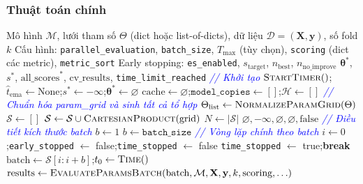 \documentclass[12pt,a4paper]{article}
\begin{document}
\subsubsection{Thuật toán chính}

\begin{algorithm}[H]
\caption{Grid Search với tối ưu hóa tài nguyên trong HAutoML}
\label{alg:grid_search}
\scriptsize
\begin{algorithmic}[1]
\Require Mô hình $\mathcal{M}$, lưới tham số $\Theta$ (dict hoặc list-of-dicts), dữ liệu $\mathcal{D} = (\mathbf{X}, \mathbf{y})$, số fold $k$
\Require Cấu hình: \texttt{parallel\_evaluation}, \texttt{batch\_size}, $T_{\max}$ (tùy chọn), \texttt{scoring} (dict các metric), \texttt{metric\_sort}
\Require Early stopping: \texttt{es\_enabled}, $s_{\text{target}}$, $n_{\text{best}}$, $n_{\text{no\_improve}}$
\Ensure $\boldsymbol{\theta}^*$, $s^*$, $\text{all\_scores}^*$, $\text{cv\_results}$, \texttt{time\_limit\_reached}
\Statex \textcolor{blue}{\textit{// Khởi tạo}}
\State $\textsc{StartTimer}()$;\quad $\hat{t}_{\text{ema}} \gets \text{None}$;\quad $s^* \gets -\infty$;\quad $\boldsymbol{\theta}^* \gets \varnothing$
\State $\text{cache} \gets \varnothing$;\quad $\texttt{model\_copies} \gets []$;\quad $\mathcal{H} \gets []$
\Statex \textcolor{blue}{\textit{// Chuẩn hóa param\_grid và sinh tất cả tổ hợp}}
\State $\Theta_{\text{list}} \gets \textsc{NormalizeParamGrid}(\Theta)$ 
\State $\mathcal{S} \gets []$
    \State $\mathcal{S} \gets \mathcal{S} \cup \textsc{CartesianProduct}(\text{grid})$ 
\EndFor
\State $N \gets |\mathcal{S}|$
    \State \Return $\varnothing, -\infty, \varnothing, \varnothing, \text{false}$
\EndIf
\Statex \textcolor{blue}{\textit{// Điều tiết kích thước batch}}
    \State $b \gets 1$ 
\Else
    \State $b \gets \texttt{batch\_size}$ 
\EndIf
\Statex \textcolor{blue}{\textit{// Vòng lặp chính theo batch}}
\State $i \gets 0$;\quad \texttt{early\_stopped} $\gets$ false;\quad \texttt{time\_stopped} $\gets$ false
        \State \texttt{time\_stopped} $\gets$ true;\quad \textbf{break}
    \EndIf
    \State $\text{batch} \gets \mathcal{S}[i : i + b]$;\quad $t_0 \gets \textsc{Time}()$
    \State $\text{results} \gets \textsc{EvaluateParamsBatch}(\text{batch}, \mathcal{M}, \mathbf{X}, \mathbf{y}, k, \text{scoring}, \ldots)$

\end{algorithmic}
\end{algorithm}
\end{document}
